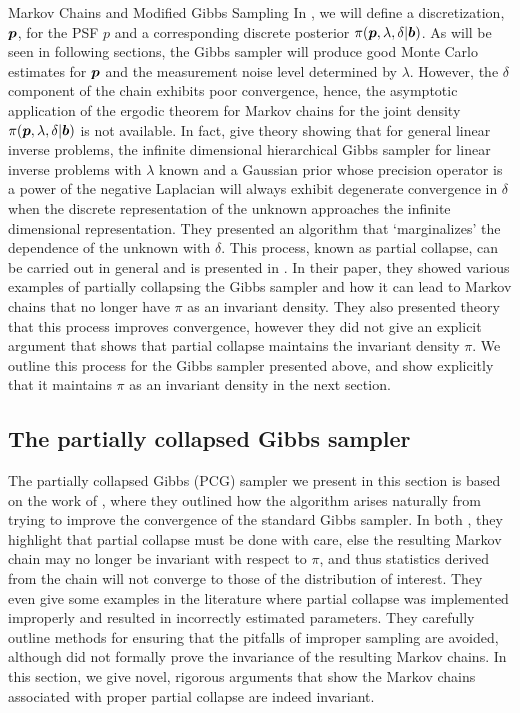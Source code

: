 \begin{chapter}{Markov Chains and Modified Gibbs Sampling}
In , we will define a discretization, $\mbox{\boldmath$p$}$, for the PSF $p$ and a corresponding discrete posterior $\pi(\mbox{\boldmath$p$},\lambda,\delta|\mbox{\boldmath$b$})$.
As will be seen in following sections, the Gibbs sampler will produce good Monte Carlo estimates for $\mbox{\boldmath$p$}$ and the measurement noise level determined by $\lambda$. 
However, the $\delta$ component of the chain exhibits poor convergence, hence, the asymptotic application of the ergodic theorem for Markov chains for the joint density $\pi(\mbox{\boldmath$p$},\lambda,\delta|\mbox{\boldmath$b$})$ is not available.
In fact, \citep{agapiou2014analysis} give theory showing that for general linear inverse problems, the infinite dimensional hierarchical Gibbs sampler for linear inverse problems with $\lambda$ known and a Gaussian prior whose precision operator is a power of the negative Laplacian will always exhibit degenerate convergence in $\delta$ when the discrete representation of the unknown approaches the infinite dimensional representation.
They presented an algorithm that `marginalizes' the dependence of the unknown with $\delta$.
This process, known as partial collapse, can be carried out in general and is presented in \citep{van2008partially}.
In their paper, they showed various examples of partially collapsing the Gibbs sampler and how it can lead to Markov chains that no longer have $\pi$ as an invariant density.
They also presented theory that this process improves convergence, however they did not give an explicit argument that shows that partial collapse maintains the invariant density $\pi$.
We outline this process for the Gibbs sampler presented above, and show explicitly that it maintains $\pi$ as an invariant density in the next section.

\subsection{The partially collapsed Gibbs sampler}
The partially collapsed Gibbs (PCG) sampler we present in this section is based on the work of \citep{van2008partially,van2015metropolis}, where they outlined how the algorithm arises naturally from trying to improve the convergence of the standard Gibbs sampler.
In both \citep{van2008partially,van2015metropolis}, they highlight that partial collapse must be done with care, else the resulting Markov chain may no longer be invariant with respect to $\pi$, and thus statistics derived from the chain will not converge to those of the distribution of interest.
They even give some examples in the literature where partial collapse was implemented improperly and resulted in incorrectly estimated parameters.
They carefully outline methods for ensuring that the pitfalls of improper sampling are avoided, although did not formally prove the invariance of the resulting Markov chains.
In this section, we give novel, rigorous arguments that show the Markov chains associated with proper partial collapse are indeed invariant.


\end{chapter}
